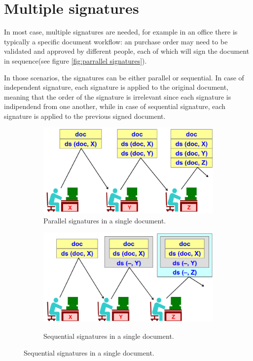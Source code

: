 \section{Multiple signatures}
In most case, multiple signatures are needed, for example in an office
there is typically a specific document workflow: an purchase order 
may need to be validated and approved by different people, each of 
which will sign the document in sequence(see figure \ref{fig:parrallel
signatures}). 

In those scenarios, the signatures can be either parallel or
sequential. In case of independent signature, each signature is applied
to the original document, meaning that the order of the signature is
irrelevant since each signature is indipendend from one another, while
in case of sequential signature, each signature is applied to the
previous signed document.
\begin{figure}[H]
  \centering
  \begin{subfigure}[b]{0.45\textwidth}
    \includegraphics[width=\textwidth]{img/paralledl signatures.png}
    \caption{Parallel signatures in a single document.}
    \label{fig:parrallel signatures}
  \end{subfigure}
  \hfill
  \begin{subfigure}[b]{0.45\textwidth}
    \includegraphics[width=\textwidth]{img/sequential signatures.png}
    \label{fig:sequential signatures}
    \caption{Sequential signatures in a single document.}
  \end{subfigure}
\end{figure}

